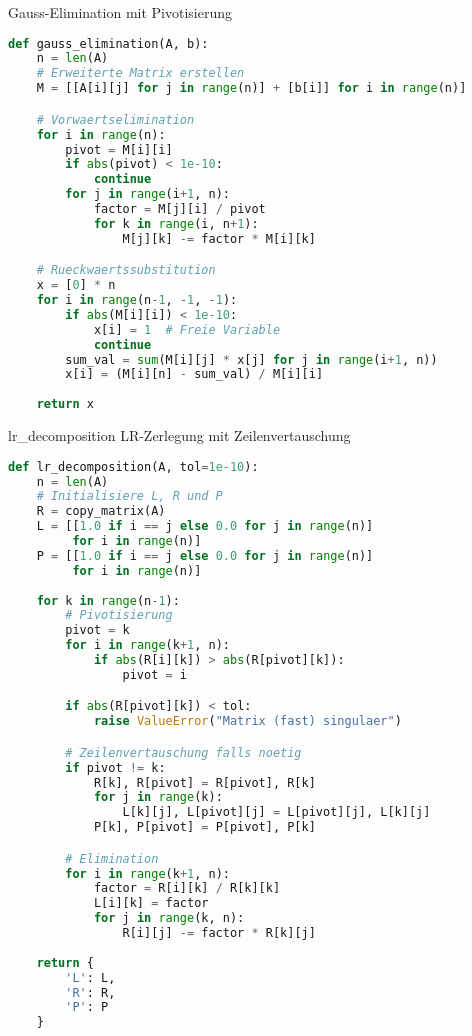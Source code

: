 \begin{examplecode}{Gauss-Elimination mit Pivotisierung}
\begin{lstlisting}[language=Python, style=basesmol]
def gauss_elimination(A, b):
    n = len(A)
    # Erweiterte Matrix erstellen
    M = [[A[i][j] for j in range(n)] + [b[i]] for i in range(n)]

    # Vorwaertselimination
    for i in range(n):
        pivot = M[i][i]
        if abs(pivot) < 1e-10:
            continue
        for j in range(i+1, n):
            factor = M[j][i] / pivot
            for k in range(i, n+1):
                M[j][k] -= factor * M[i][k]

    # Rueckwaertssubstitution
    x = [0] * n
    for i in range(n-1, -1, -1):
        if abs(M[i][i]) < 1e-10:
            x[i] = 1  # Freie Variable
            continue
        sum_val = sum(M[i][j] * x[j] for j in range(i+1, n))
        x[i] = (M[i][n] - sum_val) / M[i][i]
    
    return x
\end{lstlisting}    
\end{examplecode}

\begin{examplecode}{lr\_decomposition} LR-Zerlegung mit Zeilenvertauschung
\begin{lstlisting}[language=Python, style=basesmol]
def lr_decomposition(A, tol=1e-10):
    n = len(A)
    # Initialisiere L, R und P
    R = copy_matrix(A)
    L = [[1.0 if i == j else 0.0 for j in range(n)] 
         for i in range(n)]
    P = [[1.0 if i == j else 0.0 for j in range(n)] 
         for i in range(n)]
    
    for k in range(n-1):
        # Pivotisierung
        pivot = k
        for i in range(k+1, n):
            if abs(R[i][k]) > abs(R[pivot][k]):
                pivot = i

        if abs(R[pivot][k]) < tol:
            raise ValueError("Matrix (fast) singulaer")

        # Zeilenvertauschung falls noetig
        if pivot != k:
            R[k], R[pivot] = R[pivot], R[k]
            for j in range(k):
                L[k][j], L[pivot][j] = L[pivot][j], L[k][j]
            P[k], P[pivot] = P[pivot], P[k]

        # Elimination
        for i in range(k+1, n):
            factor = R[i][k] / R[k][k]
            L[i][k] = factor
            for j in range(k, n):
                R[i][j] -= factor * R[k][j]
    
    return {
        'L': L,
        'R': R,
        'P': P
    }
\end{lstlisting}
\end{examplecode}

